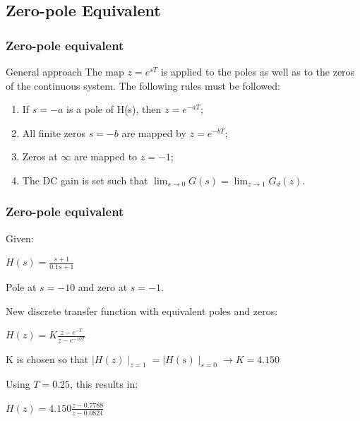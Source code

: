 \subsection{Zero-pole Equivalent}

\begin{frame}
	\frametitle{Zero-pole equivalent}
	\begin{block}{General approach}
		The map $z = e^{sT}$ is applied to the poles as well as to the zeros of the continuous system. The following rules must be followed:
		\begin{enumerate}
			\item If $s=-a$ is a pole of H(s), then $z=e^{-aT}$;
			\item All finite zeros $s=-b$ are mapped by $z = e^{-bT}$;
			\item Zeros at $\infty$ are mapped to $z = -1$;
			\item The DC gain is set such that $\lim_{s \to 0} G(s) = \lim_{z \to 1} G_d(z)$.
		\end{enumerate}
	\end{block}
\end{frame}

\begin{frame}
	\frametitle{Zero-pole equivalent}
	\begin{example}
		Given:
		\begin{center}
			$H(s) = \frac{s + 1}{0.1s + 1}$
		\end{center}
		Pole at $s=-10$ and zero at $s=-1$.
		
		New discrete transfer function with equivalent poles and zeros:
		\begin{center}
			$H(z) = K \frac{z - e^{-T}}{z - e^{-10T}}$
		\end{center}
		K is chosen so that $\mid H(z)\mid _{z=1} = \mid H(s) \mid _{s=0} \to K=4.150$

		Using $T=0.25$, this results in:
		\begin{center}
			$H(z) = 4.150 \frac{z-0.7788}{z-0.0821}$
		\end{center}
	\end{example}
\end{frame}


